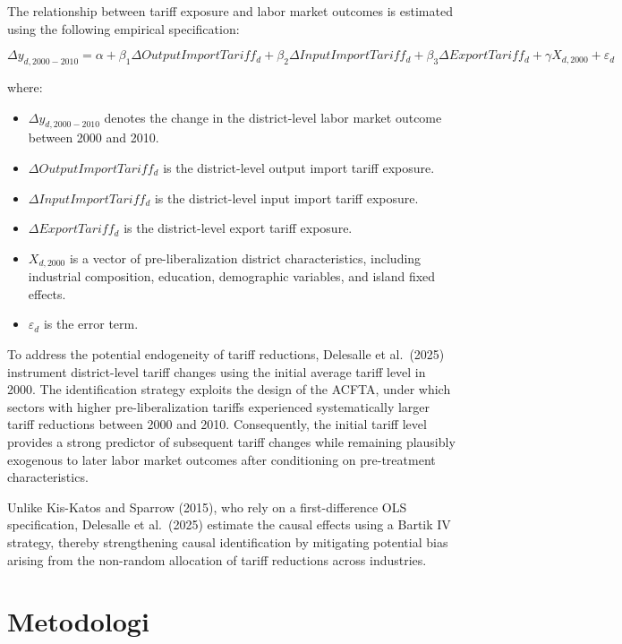 \documentclass[
  manuscript=article,
  layout=publish,
  year=2026,
  volume=1,
]{den}
\providecommand{\tightlist}{%
  \setlength{\itemsep}{0pt}\setlength{\parskip}{0pt}}
\begin{document}
The relationship between tariff exposure and labor market outcomes is
estimated using the following empirical specification:

\[
\Delta y_{d,2000-2010}
=
\alpha
+
\beta_1
\Delta OutputImportTariff_{d}
+
\beta_2
\Delta InputImportTariff_{d}
+
\beta_3
\Delta ExportTariff_{d}
+
\gamma X_{d,2000}
+
\varepsilon_d
\]

where:

\begin{itemize}
\tightlist
\item
  \(\Delta y_{d,2000-2010}\) denotes the change in the district-level
  labor market outcome between 2000 and 2010.
\item
  \(\Delta OutputImportTariff_{d}\) is the district-level output import
  tariff exposure.
\item
  \(\Delta InputImportTariff_{d}\) is the district-level input import
  tariff exposure.
\item
  \(\Delta ExportTariff_{d}\) is the district-level export tariff
  exposure.
\item
  \(X_{d,2000}\) is a vector of pre-liberalization district
  characteristics, including industrial composition, education,
  demographic variables, and island fixed effects.
\item
  \(\varepsilon_d\) is the error term.
\end{itemize}

To address the potential endogeneity of tariff reductions, Delesalle et
al.~(2025) instrument district-level tariff changes using the initial
average tariff level in 2000. The identification strategy exploits the
design of the ACFTA, under which sectors with higher pre-liberalization
tariffs experienced systematically larger tariff reductions between 2000
and 2010. Consequently, the initial tariff level provides a strong
predictor of subsequent tariff changes while remaining plausibly
exogenous to later labor market outcomes after conditioning on
pre-treatment characteristics.

Unlike Kis-Katos and Sparrow (2015), who rely on a first-difference OLS
specification, Delesalle et al.~(2025) estimate the causal effects using
a Bartik IV strategy, thereby strengthening causal identification by
mitigating potential bias arising from the non-random allocation of
tariff reductions across industries.

\section{Metodologi}\label{metodologi}
\end{document}

